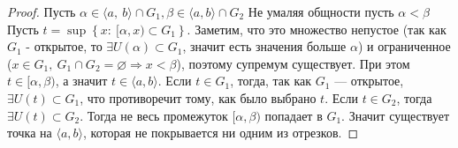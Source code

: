 \begin{proof}
Пусть $\alpha \in \langle a, \ b \rangle \cap G_1, \beta \in \langle a, b \rangle \cap G_2$
Не умаляя общности пусть $\alpha < \beta$
Пусть $t = \sup \left\{ x: \  [\alpha, x) \subset G_1 \right\}$. Заметим, что это множество непустое (так как $G_1$ - открытое, то $\exists U(\alpha) \subset G_1$, значит есть значения больше $\alpha$) и ограниченное ($x \in G_1, \ G_1 \cap G_2 = \varnothing \Rightarrow x < \beta$), поэтому супремум существует. 
При этом $t \in [\alpha, \beta)$, а значит $t \in \langle a, b \rangle$. Если $t \in G_1$, тогда, так как $G_1$ --- открытое, $\exists U(t) \subset G_1$, что противоречит тому, как было выбрано $t$. Если $t \in G_2$, тогда $\exists U(t) \subset G_2$. Тогда не весь промежуток $[\alpha, \beta)$ попадает в $G_1$.
Значит существует точка на $\langle a, b \rangle$, которая не покрывается ни одним из отрезков.
\end{proof}
\newpage